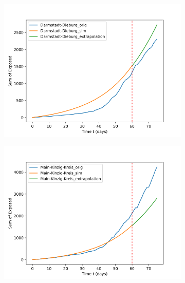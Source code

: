 \begin{figure}
	\centering
	\begin{subfigure}[b]{0.3\textwidth}
		\centering
		\includegraphics[width=\textwidth]{./figures/60d/24_Darmstadt-Dieburg.png}	
		\caption{}
	\end{subfigure}
	\hfill
	\begin{subfigure}[b]{0.3\textwidth}
		\centering
		\includegraphics[width=\textwidth]{./figures/60d/13_Main-Kinzig-Kreis.png}	
		\caption{}
	\end{subfigure}
	\hfill
	\begin{subfigure}[b]{0.3\textwidth}
		\centering

\end{subfigure}
\end{figure}
